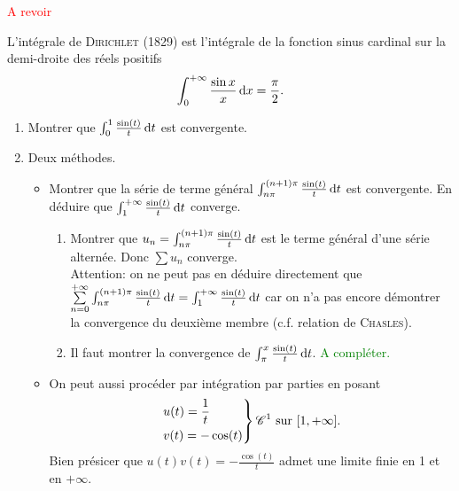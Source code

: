 \textcolor{red}{A revoir}
\begin{prop}{}
    L'intégrale de \textsc{Dirichlet} (1829) est l'intégrale de la fonction sinus cardinal sur la demi-droite des réels positifs
    $$\int_{0}^{+\infty} \frac{\sin x}{x} \, \mathrm{d} x = \frac{\pi}{2}.$$
\end{prop}

\begin{marginfigure}[0cm]
    
\end{marginfigure}

\begin{preuve}
    \begin{enumerate}
        \item Montrer que $\int_{0}^{1} \frac{\sin (t)}{t} \, \mathrm{d} t$ est convergente. 
        \item Deux méthodes.
        \begin{itemize}
            \item Montrer que la série de terme général $\int_{n \pi}^{(n+1) \pi} \frac{\sin(t)}{t} \, \mathrm{d} t$ est convergente. En déduire que $\int_{1}^{+ \infty} \frac{\sin(t)}{t} \, \mathrm{d} t$ converge. 
            \begin{enumerate}
                \item Montrer que $u_n = \int_{n \pi}^{(n+1) \pi} \frac{\sin(t)}{t} \, \mathrm{d} t$ est le terme général d'une série alternée. Donc $\sum u_n$ converge.\\
                Attention: on ne peut pas en déduire directement que $\sum\limits_{n=0}^{+ \infty} \int_{n \pi}^{(n+1) \pi} \frac{\sin(t)}{t} \, \mathrm{d} t = \int_{1}^{+ \infty} \frac{\sin(t)}{t} \, \mathrm{d} t$ car on n'a pas encore démontrer la convergence du deuxième membre (c.f. relation de \textsc{Chasles}).\\
                \item Il faut montrer la convergence de $\int_{\pi}^{x} \frac{\sin (t)}{t} \, \mathrm{d} t$. \textcolor{green}{A compléter.}
            \end{enumerate}
            \item On peut aussi procéder par intégration par parties en posant
            $$
            \begin{drcases}                
                u(t) = \frac{1}{t}\\
                v(t) = - \cos(t)
            \end{drcases}
            \mathscr{C}^1 \text{ sur } [1, +\infty].
            $$
            Bien présicer que $u(t)v(t)=-\frac{\cos(t)}{t}$ admet une limite finie en 1 et en $+ \infty$.\\

\end{itemize}
\end{enumerate}
\end{preuve}
